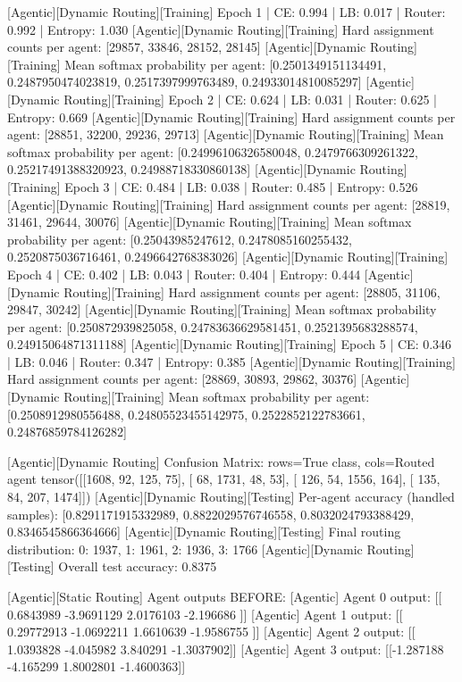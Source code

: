 [Agentic][Dynamic Routing][Training] Epoch 1 | CE: 0.994 | LB: 0.017 | Router: 0.992 | Entropy: 1.030
[Agentic][Dynamic Routing][Training] Hard assignment counts per agent: [29857, 33846, 28152, 28145]
[Agentic][Dynamic Routing][Training] Mean softmax probability per agent: [0.2501349151134491, 0.2487950474023819, 0.2517397999763489, 0.24933014810085297]
[Agentic][Dynamic Routing][Training] Epoch 2 | CE: 0.624 | LB: 0.031 | Router: 0.625 | Entropy: 0.669
[Agentic][Dynamic Routing][Training] Hard assignment counts per agent: [28851, 32200, 29236, 29713]
[Agentic][Dynamic Routing][Training] Mean softmax probability per agent: [0.24996106326580048, 0.2479766309261322, 0.25217491388320923, 0.24988718330860138]
[Agentic][Dynamic Routing][Training] Epoch 3 | CE: 0.484 | LB: 0.038 | Router: 0.485 | Entropy: 0.526
[Agentic][Dynamic Routing][Training] Hard assignment counts per agent: [28819, 31461, 29644, 30076]
[Agentic][Dynamic Routing][Training] Mean softmax probability per agent: [0.25043985247612, 0.2478085160255432, 0.2520875036716461, 0.2496642768383026]
[Agentic][Dynamic Routing][Training] Epoch 4 | CE: 0.402 | LB: 0.043 | Router: 0.404 | Entropy: 0.444
[Agentic][Dynamic Routing][Training] Hard assignment counts per agent: [28805, 31106, 29847, 30242]
[Agentic][Dynamic Routing][Training] Mean softmax probability per agent: [0.250872939825058, 0.24783636629581451, 0.2521395683288574, 0.24915064871311188]
[Agentic][Dynamic Routing][Training] Epoch 5 | CE: 0.346 | LB: 0.046 | Router: 0.347 | Entropy: 0.385
[Agentic][Dynamic Routing][Training] Hard assignment counts per agent: [28869, 30893, 29862, 30376]
[Agentic][Dynamic Routing][Training] Mean softmax probability per agent: [0.2508912980556488, 0.24805523455142975, 0.2522852122783661, 0.24876859784126282]

[Agentic][Dynamic Routing] Confusion Matrix: rows=True class, cols=Routed agent
tensor([[1608,   92,  125,   75],
[  68, 1731,   48,   53],
[ 126,   54, 1556,  164],
[ 135,   84,  207, 1474]])
[Agentic][Dynamic Routing][Testing] Per-agent accuracy (handled samples): [0.8291171915332989, 0.8822029576746558, 0.8032024793388429, 0.8346545866364666]
[Agentic][Dynamic Routing][Testing] Final routing distribution: {0: 1937, 1: 1961, 2: 1936, 3: 1766}
[Agentic][Dynamic Routing][Testing] Overall test accuracy: 0.8375

[Agentic][Static Routing] Agent outputs BEFORE:
[Agentic] Agent 0 output: [[ 0.6843989 -3.9691129  2.0176103 -2.196686 ]]
[Agentic] Agent 1 output: [[ 0.29772913 -1.0692211   1.6610639  -1.9586755 ]]
[Agentic] Agent 2 output: [[ 1.0393828 -4.045982   3.840291  -1.3037902]]
[Agentic] Agent 3 output: [[-1.287188  -4.165299   1.8002801 -1.4600363]]


